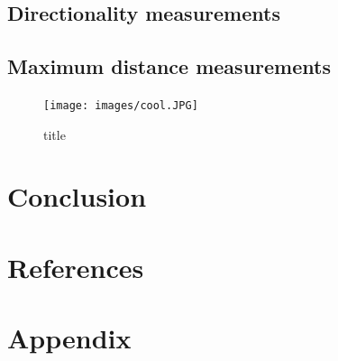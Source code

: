 \documentclass[12pt,a4paper]{article}
\begin{document}
	\subsection{Directionality measurements}

	\subsection{Maximum distance measurements}
		
		\begin{figure}
			\texttt{[image: images/cool.JPG]}
			\caption{title}
			\label{cool}
		\end{figure}

\section{Conclusion}
	

\section{References}




\section{Appendix}
\pagestyle{empty}



\end{document}
